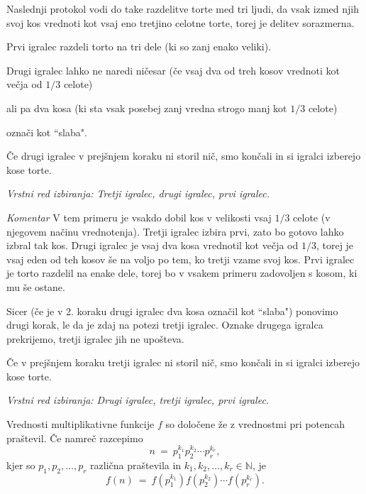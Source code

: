 \documentclass[a4paper,12pt]{article}
\def\N{\mathbb{N}} %
\begin{document}
Naslednji protokol vodi do take razdelitve torte med tri ljudi, da vsak izmed njih svoj kos vrednoti kot vsaj eno tretjino celotne torte, torej je delitev sorazmerna.

\begin{protokol}
\item Prvi igralec razdeli torto na tri dele {\color{gray} (ki so zanj enako veliki)}.

\item Drugi igralec lahko ne naredi ničesar {\color{gray} (če vsaj dva od treh kosov vrednoti kot večja od $1/3$ celote)}

ali pa dva kosa {\color{gray} (ki sta vsak posebej zanj vredna strogo manj kot $1/3$ celote)}

označi kot ``slaba".

\item Če drugi igralec v prejšnjem koraku ni storil nič, smo končali in si igralci izberejo kose torte.

\textsl{Vrstni red izbiranja: Tretji igralec, drugi igralec, prvi igralec.}

\item [\em Komentar] V tem primeru je vsakdo dobil kos v velikosti vsaj  $1/3$ celote (v njegovem načinu vrednotenja). Tretji igralec izbira prvi, zato bo gotovo lahko izbral tak kos. Drugi igralec je vsaj dva kosa vrednotil kot večja od  $1/3$, torej je vsaj eden od teh kosov še na voljo po tem, ko tretji vzame svoj kos. Prvi igralec je torto razdelil na enake dele, torej bo v vsakem primeru zadovoljen s kosom, ki mu še ostane.

\item Sicer (če je v 2. koraku drugi igralec dva kosa označil kot ``slaba") ponovimo drugi korak, le da je zdaj na potezi tretji igralec. Oznake drugega igralca prekrijemo, tretji igralec jih ne upošteva.

\item Če v prejšnjem koraku tretji igralec ni storil nič,  smo končali in si igralci izberejo kose torte.

\textsl{Vrstni red izbiranja: Drugi igralec, tretji igralec, prvi igralec.}

\end{protokol}



Vrednosti multiplikativne funkcije $f$  so določene že z vrednostmi pri
potencah praštevil. Če namreč razcepimo 
\[
n\ =\ p_1^{k_1} p_2^{k_2} \cdots p_r^{k_r},
\]
kjer so $p_1, p_2, \ldots, p_r$ različna praštevila in $k_1, k_2, \ldots, k_r \in \N$, je
\[
f(n)\ =\ f\!\left(p_1^{k_1}\right) f\!\left(p_2^{k_2}\right) \cdots f\!\left(p_r^{k_r}\right).
\]
\end{document}
